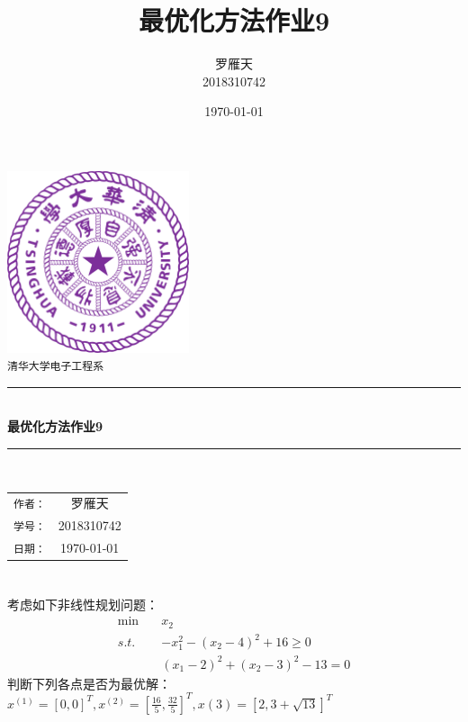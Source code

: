 \documentclass[a4paper]{article}
\title{最优化方法作业9}
\author{罗雁天 \\
2018310742}
\date{\today}
\begin{document}
\newcommand{\HRule}{\rule{\linewidth}{0.5mm}}
\begin{titlepage}
	\begin{center}
		\includegraphics[width=0.4\textwidth]{Tsinghua2.png}\\[1cm]
		\textsc{\Large \texttt{清华大学电子工程系}}\\[1cm]
		\HRule \\[1cm]
		{\Huge \bfseries 最优化方法作业9}\\[0.4cm]
		\HRule \\[3.5cm]
		\begin{minipage}{0.4\textwidth}
			\begin{center}
				\Large
				\begin{tabular}{cc}
					\texttt{作者：} & 罗雁天 \\[0.5cm]
					\texttt{学号：} & 2018310742 \\[0.5cm]
					\texttt{日期：} & \today
				\end{tabular}
			\end{center}
		\end{minipage}
		\vfill
	\end{center}
\end{titlepage}

\section{}
考虑如下非线性规划问题：
\begin{equation}
\begin{aligned}
\min\quad&x_2 \\
s.t.\quad&-x_1^2-(x_2-4)^2+16\ge 0\\
&(x_1-2)^2+(x_2-3)^2-13=0
\end{aligned}
\end{equation}
判断下列各点是否为最优解：
$x^{(1)}=[0,0]^T,x^{(2)}=\left[\frac{16}{5}, \frac{32}{5}\right]^T,x{(3)}=\left[2,3+\sqrt{13}\right]^T$
\end{document}
